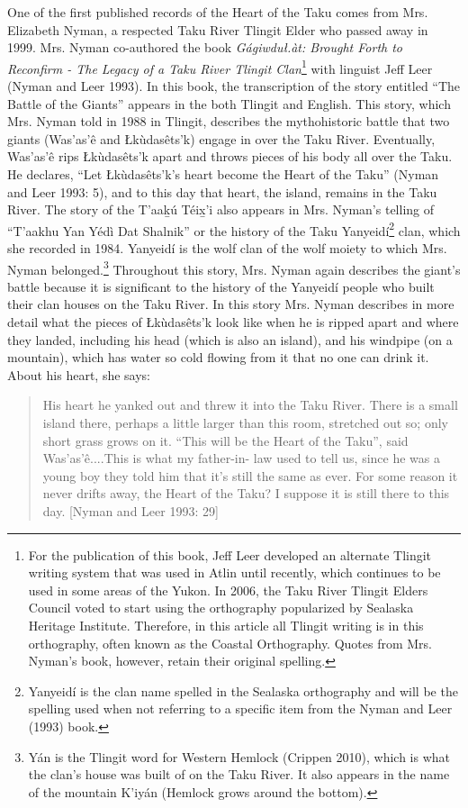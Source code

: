 One of the first published records of the Heart of the Taku comes from Mrs. Elizabeth Nyman, a respected Taku River Tlingit Elder who passed away in 1999. Mrs. Nyman co-authored the book \textit{Gágiwduł.àt: Brought Forth to Reconfirm - The Legacy of a Taku River Tlingit Clan}\footnote{ For the publication of this book, Jeff Leer developed an alternate Tlingit writing system that was used in Atlin until recently, which continues to be used in some areas of the Yukon. In 2006, the Taku River Tlingit Elders Council voted to start using the orthography popularized by Sealaska Heritage Institute. Therefore, in this article all Tlingit writing is in this orthography, often known as the Coastal Orthography. Quotes from Mrs. Nyman’s book, however, retain their original spelling.}  with linguist Jeff Leer (Nyman and Leer 1993). In this book, the transcription of the story entitled “The Battle of the Giants” appears in the both Tlingit and English. This story, which Mrs. Nyman told in 1988 in Tlingit, describes the mythohistoric battle that two giants (Was’as’ê and Łkùdasêts’k) engage in over the Taku River. Eventually, Was’as’ê rips Łkùdasêts’k apart and throws pieces of his body all over the Taku. He declares, “Let Łkùdasêts’k’s heart become the Heart of the Taku” (Nyman and Leer 1993: 5), and to this day that heart, the island, remains in the Taku River. The story of the T'aak̲ú Téix̲'i also appears in Mrs. Nyman’s telling of “T’aakhu Yan Yédì Dat Shalnik” or the history of the Taku Yanyeidí\footnote{Yanyeidí is the clan name spelled in the Sealaska orthography and will be the spelling used when not referring to a specific item from the Nyman and Leer (1993) book. } clan, which she recorded in 1984. Yanyeidí is the wolf clan of the wolf moiety to which Mrs. Nyman belonged.\footnote{ Yán is the Tlingit word for Western Hemlock (Crippen 2010), which is what the clan’s house was built of on the Taku River. It also appears in the name of the mountain K’iyán (Hemlock grows around the bottom).} Throughout this story, Mrs. Nyman again describes the giant’s battle because it is significant to the history of the Yanyeidí people who built their clan houses on the Taku River. In this story Mrs. Nyman describes in more detail what the pieces of Łkùdasêts’k look like when he is ripped apart and where they landed, including his head (which is also an island), and his windpipe (on a mountain), which has water so cold flowing from it that no one can drink it. About his heart, she says:

\begin{quote}
His heart he yanked out and threw it into the Taku River. There is a small island there, perhaps a little larger than this room, stretched out so; only short grass grows on it. “This will be the Heart of the Taku”, said Was’as’ê....This is what my father-in- law used to tell us, since he was a young boy they told him that it’s still the same as ever. For some reason it never drifts away, the Heart of the Taku? I suppose it is still there to this day. [Nyman and Leer 1993: 29]
\end{quote}

